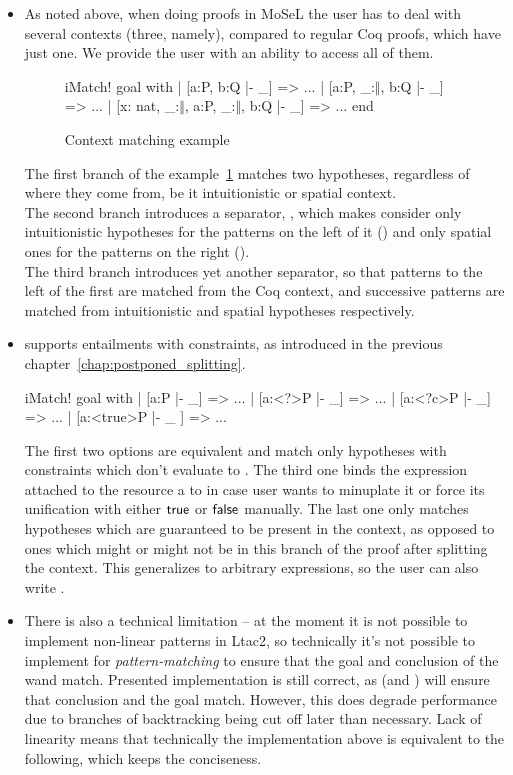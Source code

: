 \begin{itemize}
\item As noted above, when doing proofs in MoSeL the user has to deal with several contexts (three, namely), compared to regular Coq proofs, which have just one.
  We provide the user with an ability to access all of them.
  \begin{figure}[H]
  \begin{coq}
       iMatch! goal with
       | [a:P, b:Q |- _] => ...
       | [a:P, _:$\Vert$, b:Q |- _] => ...
       | [x: nat, _:$\Vert$, a:P, _:$\Vert$, b:Q |- _] => ...
       end
   \end{coq}
   \caption{Context matching example}
   \label{fig:example:contex_matching}
  \end{figure}
  The first branch of the example~\ref{fig:example:contex_matching} matches two hypotheses, regardless of where they come from, be it intuitionistic or spatial context.\\
  The second branch introduces a separator, \coqe{_:$\Vert$}, which makes  consider only intuitionistic hypotheses for the patterns on the left of it () and only spatial ones for the patterns on the right ().\\
  The third branch introduces yet another separator, so that patterns to the left of the first \coqe{_:$\Vert$} are matched from the Coq context, and successive patterns are matched from intuitionistic and spatial hypotheses respectively.

\item {} supports entailments with constraints, as introduced in the previous chapter~\ref{chap:postponed_splitting}.
\begin{coq}
iMatch! goal with
| [a:P |- _] => ...
| [a:<?>P |- _] => ...
| [a:<?c>P |- _] => ...
| [a:<true>P |- _ ] => ...
\end{coq}
The first two options are equivalent and match only hypotheses with constraints which don't evaluate to \false.
The third one binds the expression attached to the resource a to  in case user wants to minuplate it or force its unification with either $\textsf{true}$ or $\textsf{false}$ manually.
The last one only matches hypotheses which are guaranteed to be present in the context, as opposed to ones which might or might not be in this branch of the proof after splitting the context.
This generalizes to arbitrary expressions, so the user can also write .
\item There is also a technical limitation -- at the moment it is not possible to implement non-linear patterns in Ltac2, so technically it's not possible to implement  for \emph{pattern-matching} to ensure that the goal and conclusion of the wand match.
  Presented implementation is still correct, as  (and ) will ensure that conclusion and the goal match.
  However, this does degrade performance due to branches of backtracking being cut off later than necessary.
  Lack of linearity means that technically the implementation above is equivalent to the following, which keeps the conciseness.


\end{itemize}
